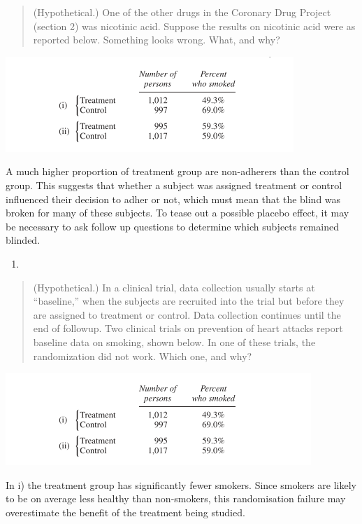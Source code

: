 \documentclass[
]{book}
\providecommand{\tightlist}{%
  \setlength{\itemsep}{0pt}\setlength{\parskip}{0pt}}
\begin{document}
\begin{quote}
(Hypothetical.) One of the other drugs in the Coronary Drug Project (section 2) was nicotinic acid. Suppose the results on nicotinic acid were as reported below. Something looks wrong. What, and why?
\end{quote}

\includegraphics{images/Ch02Img02.png}

A much higher proportion of treatment group are non-adherers than the control group. This suggests that whether a subject was assigned treatment or control influenced their decision to adher or not, which must mean that the blind was broken for many of these subjects. To tease out a possible placebo effect, it may be necessary to ask follow up questions to determine which subjects remained blinded.

\begin{enumerate}
\def\labelenumi{\arabic{enumi}.}
\setcounter{enumi}{6}
\tightlist
\item
\end{enumerate}

\begin{quote}
(Hypothetical.) In a clinical trial, data collection usually starts at ``baseline,'' when the subjects are recruited into the trial but before they are assigned to treatment or control. Data collection continues until the end of followup. Two clinical trials on prevention of heart attacks report baseline data on smoking, shown below. In one of these trials, the randomization did not work. Which one, and why?
\end{quote}

\includegraphics{images/Ch02Img03.png}

In i) the treatment group has significantly fewer smokers. Since smokers are likely to be on average less healthy than non-smokers, this randomisation failure may overestimate the benefit of the treatment being studied.
\end{document}

